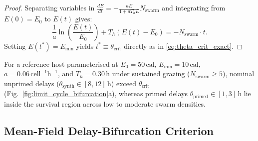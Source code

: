 \begin{proof}
Separating variables in $\frac{dE}{dt} = -\frac{a E}{1 + a T_h E} N_{\mathrm{swarm}}$ and integrating from $E(0) = E_0$ to $E(t)$ gives:
\begin{equation}
  \frac{1}{a} \ln\left(\frac{E(t)}{E_0}\right) + T_h \left(E(t) - E_0\right) = - N_{\mathrm{swarm}} \cdot t.
  \label{eq:integrated_depletion}
\end{equation}
Setting $E(t^*) = E_{\min}$ yields $t^* \equiv \theta_{\mathrm{crit}}$ directly as in \eqref{eq:theta_crit_exact}.
\end{proof}

\begin{remark}
For a reference host parameterised at $E_0 = 50\,\text{cal}$, $E_{\min}=10\,\text{cal}$, $a=0.06\,\text{cell}^{-1}\text{h}^{-1}$, and $T_h=0.30\,\text{h}$ under sustained grazing ($N_{\mathrm{swarm}} \geq 5$), nominal unprimed delays ($\theta_{\mathrm{synth}} \in [8, 12]\,\text{h}$) exceed $\theta_{\mathrm{crit}}$ (Fig.~\ref{fig:limit_cycle_bifurcation}a), whereas primed delays $\theta_{\mathrm{primed}} \in [1, 3]\,\text{h}$ lie inside the survival region across low to moderate swarm densities.
\end{remark}

\subsection{Mean-Field Delay-Bifurcation Criterion}
\label{subsec:hopf_limit_cycle}


